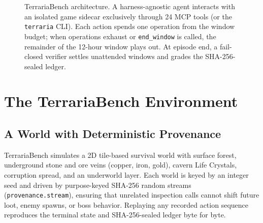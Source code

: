 \documentclass[10pt,letterpaper]{article}
\begin{document}
\begin{figure}[t]
\caption{TerrariaBench architecture. A harness-agnostic agent interacts with an isolated game sidecar exclusively through 24 MCP tools (or the \texttt{terraria} CLI). Each action spends one operation from the window budget; when operations exhaust or \texttt{end\_window} is called, the remainder of the 12-hour window plays out. At episode end, a fail-closed verifier settles unattended windows and grades the SHA-256-sealed ledger.}
\label{fig:overview}
\end{figure}

\section{The TerrariaBench Environment}

\subsection{A World with Deterministic Provenance}
TerrariaBench simulates a 2D tile-based survival world with surface forest, underground stone and ore veins (copper, iron, gold), cavern Life Crystals, corruption spread, and an underworld layer. Each world is keyed by an integer seed and driven by purpose-keyed SHA-256 random streams (\texttt{provenance.stream}), ensuring that unrelated inspection calls cannot shift future loot, enemy spawns, or boss behavior. Replaying any recorded action sequence reproduces the terminal state and SHA-256-sealed ledger byte for byte.
\end{document}

